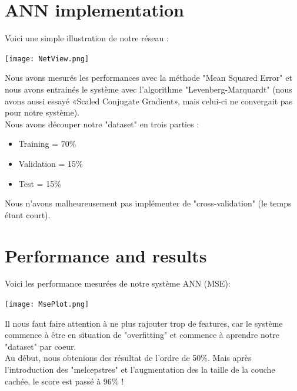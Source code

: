 \section{ANN implementation}

Voici une simple illustration de notre réseau :
\begin{center} 
\hspace{15cm}
\texttt{[image: NetView.png]}
\end{center}
\vspace{0.5cm} 

Nous avons mesurés les performances avec la méthode "Mean Squared Error" et nous avons entrainés le système avec l'algorithme "Levenberg-Marquardt" (nous avons aussi essayé «Scaled Conjugate Gradient», mais celui-ci ne convergait pas pour notre système).\\

Nous avons découper notre "dataset" en trois parties :
\begin{itemize}
\item Training = 70\%
\item Validation = 15\%
\item Test = 15\%\\

\end{itemize}

Nous n'avons malheureusement pas implémenter de "cross-validation" (le temps étant court). 

\pagebreak
\section{Performance and results}

Voici les performance mesurées de notre système ANN (MSE):
\begin{center} 
\hspace{15cm}
\texttt{[image: MsePlot.png]}
\end{center}
\vspace{0.5cm} 

Il nous faut faire attention à ne plus rajouter trop de features, car le système commence à être en situation de "overfitting" et commence à aprendre notre "dataset" par coeur.\\


Au début, nous obtenions des résultat de l'ordre de 50\%. Mais après l'introduction des "melcepstres" et l'augmentation des la taille de la couche cachée, le score est passé à 96\% !\\

